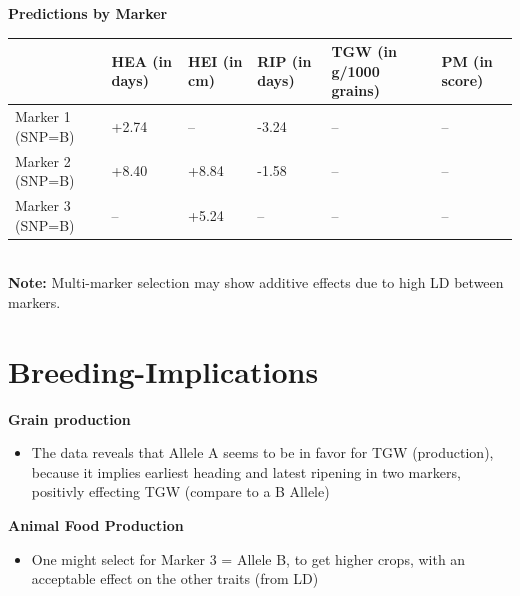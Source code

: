 \documentclass{article}
\begin{document}
			\bigskip
			\textbf{Predictions by Marker} \\
			
				\begin{tabular}{l|l|l|l|l|l}
						 				& HEA (in days)		& HEI (in cm) 		& RIP (in days)		& TGW (in g/1000 grains) 		& PM (in score) \\ \hline
					Marker 1 (SNP=B)	& +2.74 			&  --	 			& -3.24 			& --							& --			\\ \hline
					Marker 2 (SNP=B)	& +8.40 			&  +8.84 			& -1.58 			& --							& --			\\ \hline
					Marker 3 (SNP=B)	& -- 				&  +5.24 			& --	 			& --							& --			\\ \hline
				\end{tabular} \\


				\textbf{Note:} Multi-marker selection may show additive effects due to high LD between markers.
			
		\section{Breeding-Implications}
			
			\textbf{Grain production}
			\begin{itemize}
				\item  The data reveals that Allele A seems to be in favor for TGW (production), because it implies earliest heading and latest ripening in two markers, positivly effecting TGW (compare to a B Allele)
			\end{itemize}
			
			\textbf{Animal Food Production}
			\begin{itemize}
				\item One might select for Marker 3 = Allele B, to get higher crops, with an acceptable effect on the other traits (from LD)
			\end{itemize}
			
	
\end{document}
